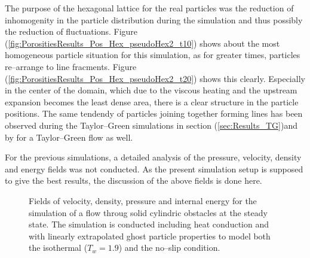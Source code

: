 \documentclass{report}
\begin{document}
The purpose of the hexagonal lattice for the real particles was the reduction of inhomogenity in the particle distribution during the simulation and thus possibly the reduction of fluctuations.  Figure (\ref{fig:PorositiesResults_Pos_Hex_pseudoHex2_t10}) shows about the most homogeneous particle situation for this simulation, as for greater times, particles re--arrange to line fracments. Figure (\ref{fig:PorositiesResults_Pos_Hex_pseudoHex2_t20}) shows this clearly. Especially in the center of the domain, which due to the viscous heating and the upstream expansion becomes the least dense area, there is a clear structure in the particle positions. The same tendendy of particles joining together forming lines has been observed during the Taylor--Green simulations in section (\ref{sec:Results_TG})and by \cite{Ellero2007} for a Taylor--Green flow as well. 

For the previous simulations, a detailed analysis of the pressure, velocity, density and energy fields was not conducted. As the present simulation setup is supposed to give the best results, the discussion of the above fields is done here.

\begin{figure}[h]

\centering
\label{fig:Cylinders_Hex_steadyState}

\caption[Property fields for Porosity]{Fields of velocity, density, pressure and internal energy for the simulation of a flow throug solid cylindric obstacles at the steady state. The simulation is conducted including heat conduction and with linearly extrapolated ghost particle properties to model both the isothermal ($T_w=1.9$) and the no--slip condition.}

\end{figure}
\end{document}
